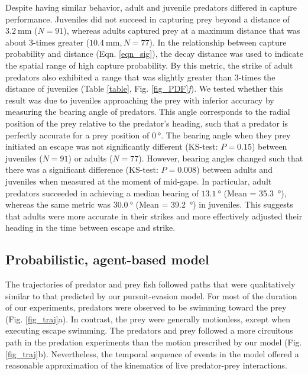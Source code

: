 \documentclass[]{rsos}%
\begin{document}
Despite having similar behavior, adult and juvenile predators differed in capture performance.
Juveniles did not succeed in capturing prey beyond a distance of $\SI{3.2}{\mm}$ ($N = 91$), whereas adults captured prey at a maximum distance that was about 3-times greater ($\SI{10.4}{\mm}, N = 77$).
In the relationship between capture probability and distance (Eqn. \ref{eqn_sig}), the decay distance was used to indicate the spatial range of high capture probability. 
By this metric, the strike of adult predators also exhibited a range that was slightly greater than 3-times the distance of juveniles (Table \ref{table}, Fig. \ref{fig_PDF}\textit{f}).
We tested whether this result was due to juveniles approaching the prey with inferior accuracy by measuring the bearing angle of predators.
This angle corresponds to the radial position of the prey relative to the predator's heading, such that a predator is perfectly accurate for a prey position of $\SI{0}{\degree}$.
The bearing angle when they prey initiated an escape was not significantly different (KS-test: $P = 0.15$) between juveniles ($N = 91$) or adults ($N = 77$).
However, bearing angles changed such that there was a significant difference (KS-test: $P = 0.008$) between adults and juveniles when measured at the moment of mid-gape.
In particular, adult predators succeeded in achieving a median bearing of $\SI{13.1}{\degree}$ (Mean = \SI{35.3}{\degree}), whereas the same metric was $\SI{30.0}{\degree}$ (Mean = \SI{39.2}{\degree}) in juveniles.
This suggests that adults were more accurate in their strikes and more effectively adjusted their heading in the time between escape and strike.


\subsection{Probabilistic, agent-based model} %
The trajectories of predator and prey fish followed paths that were qualitatively similar to that predicted by our pursuit-evasion model.
For most of the duration of our experiments, predators were observed to be swimming toward the prey (Fig. \ref{fig_traj}a). 
In contrast, the prey were generally motionless, except  when executing escape swimming.
The predators and prey followed a more circuitous path in the predation experiments than the motion prescribed by our model (Fig. \ref{fig_traj}b).
Nevertheless, the temporal sequence of events in the model offered a reasonable approximation of the kinematics of live predator-prey interactions.
\end{document}
